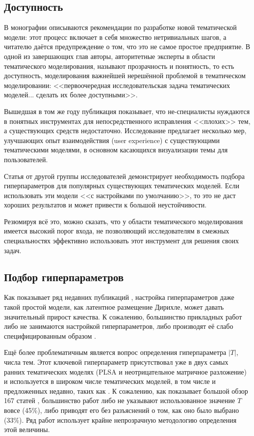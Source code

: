 \subsection{Доступность}

В монографии \cite{fntir2017applications} описываются рекомендации по разработке новой тематической модели: этот процесс включает в себя множество нетривиальных шагов, а читателю даётся предупреждение о том, что это не самое простое предприятие. В одной из завершающих глав авторы, авторитетные эксперты в области тематического моделирования, называют прозрачность и понятность, то есть доступность, моделирования важнейшей нерешённой проблемой в тематическом моделировании: <<первоочередная исследовательская задача тематических моделей... сделать их более доступными>>.

Вышедшая в том же году публикация \cite{lee2017human} показывает, что не-специалисты нуждаются в понятных инструментах для непосредственного исправления <<плохих>> тем, а существующих средств недостаточно. Исследование предлагает несколько мер, улучшающих опыт взаимодействия (user experience) с существующими тематическими моделями, в основном касающихся визуализации темы для пользователей.

Статья от другой группы исследователей \cite{agrawal2018wrong} демонстрирует необходимость подбора гиперпараметров для популярных существующих тематических моделей. Если использовать эти модели <<с настройками по умолчанию>>, то это не даст хороших результатов и может привести к большой неустойчивости.

Резюмируя всё это, можно сказать, что у области тематического моделирования имеется высокий порог входа, не позволяющий исследователям в смежных специальностях эффективно использовать этот инструмент для решения своих задач.

\subsection{Подбор гиперпараметров}

Как показывает ряд недавних публикаций \cite{agrawal2018wrong,fan2019assessing}, настройка гиперпараметров даже такой простой модели, как латентное размещение Дирихле, может давать значительный прирост качества. К сожалению, большинство прикладных работ либо не занимаются настройкой гиперпараметров, либо производят её слабо специфицированным образом \cite{agrawal2018wrong}.

Ещё более проблематичным является вопрос определения гиперпараметра $|T|$, числа тем. Этот ключевой гиперпараметр присутствовал уже в двух самых ранних тематических моделях (PLSA и неотрицательное матричное разложение) и используется в широком числе тематических моделей, в том числе и предложенных недавно, таких как \cite{zosa-granroth-wilding-2019-multilingual}. К сожалению, как показывает большой обзор 167 статей \cite{chen2016survey}, большинство работ либо не указывают использованное значение $T$ вовсе (45\%), либо приводят его без разъяснений о том, как оно было выбрано (33\%). Ряд работ использует крайне непрозрачную методологию определения этой величины.

